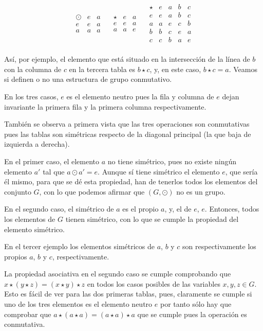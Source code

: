 $$
  \begin{array}{c|cc}
    \odot & e & a \\
    \hline
    e & e & a \\
    a & a & a \\
  \end{array}
  \quad
  \begin{array}{c|cc}
    \star & e & a \\
    \hline
    e & e & a \\
    a & a & e \\
  \end{array}
  \quad
  \begin{array}{c|cccc}
    \star & e & a & b & c \\
    \hline
    e & e & a & b & c \\
    a & a & e & c & b \\
    b & b & c & e & a \\
    c & c & b & a & e \\
  \end{array}
$$

Así, por ejemplo, el elemento que está situado en la intersección de la
línea de $b$ con la columna de $c$ en la tercera tabla es $b \star c$, y, en
este caso, $b \star c = a$. Veamos si definen o no una estructura de grupo
conmutativo.

En los tres casos, $e$ es el elemento neutro pues la fila y columna de $e$
dejan invariante la primera fila y la primera columna respectivamente.

También se observa a primera vista que las tres operaciones son conmutativas
pues las tablas son simétricas respecto de la diagonal principal (la que
baja de izquierda a derecha).

En el primer caso, el elemento $a$ no tiene simétrico, pues no existe ningún
elemento $a'$ tal que $a \odot a' = e$. Aunque sí tiene simétrico el
elemento $e$, que sería él mismo, para que se dé esta propiedad, han de
tenerlos todos los elementos del conjunto $G$, con lo que podemos afirmar
que $(G, \odot)$ no es un grupo.

En el segundo caso, el simétrico de $a$ es el propio $a$, y, el de $e$, $e$.
Entonces, todos los elementos de $G$ tienen simétrico, con lo que se cumple
la propiedad del elemento simétrico.

En el tercer ejemplo los elementos simétricos de $a$, $b$ y $c$ son
respectivamente los propios $a$, $b$ y $c$, respectivamente.

La propiedad asociativa en el segundo caso se cumple comprobando que $x
\star (y \star z) = (x \star y) \star z$ en todos los casos posibles de las
variables $x, y, z \in G$. Esto es fácil de ver para las dos primeras
tablas, pues, claramente se cumple si uno de los tres elementos es el
elemento neutro $e$ por tanto sólo hay que comprobar que $a \star (a \star
a) = (a \star a) \star a$ que se cumple pues la operación es conmutativa.

